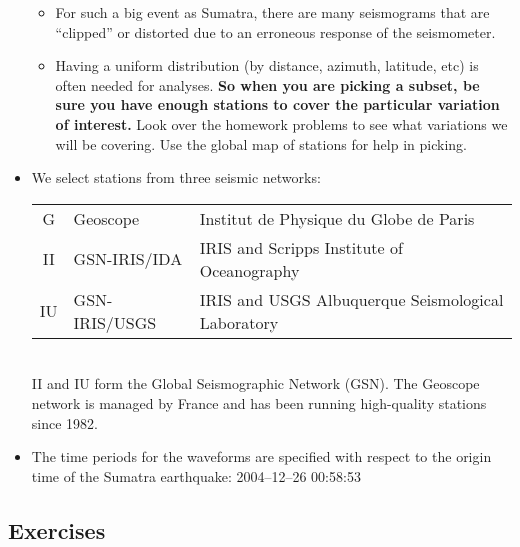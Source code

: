 \documentclass[11pt,titlepage,fleqn]{article}
\begin{document}
\begin{itemize}
\begin{itemize}
\item For such a big event as Sumatra, there are many seismograms that are ``clipped'' or distorted due to an erroneous response of the seismometer.

\item Having a uniform distribution (by distance, azimuth, latitude, etc) is often needed for analyses. {\bf So when you are picking a subset, be sure you have enough stations to cover the particular variation of interest.} Look over the homework problems to see what variations we will be covering. Use the global map of stations for help in picking.
\end{itemize}

\item We select stations from three seismic networks: \\

\begin{tabular}{cll}
\hline
G   & Geoscope      & Institut de Physique du Globe de Paris \\
II  & GSN-IRIS/IDA  & IRIS and Scripps Institute of Oceanography \\
IU  & GSN-IRIS/USGS & IRIS and USGS Albuquerque Seismological Laboratory \\
\hline
\end{tabular} \\

\noindent
II and IU form the Global Seismographic Network (GSN).
The Geoscope network is managed by France and has been running high-quality stations since 1982.

\item The time periods for the waveforms are specified with respect to the origin time of the Sumatra earthquake: 2004--12--26 00:58:53


\end{itemize}


\subsection*{Exercises}
\end{document}
